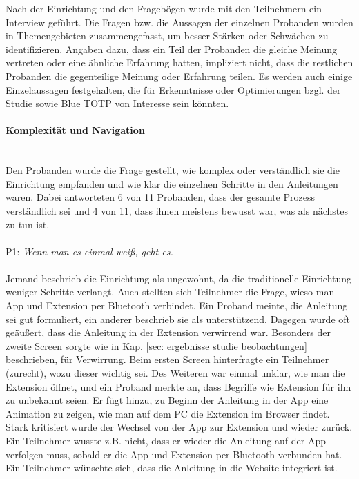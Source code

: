 Nach der Einrichtung und den Fragebögen wurde mit den Teilnehmern ein Interview 
geführt. Die Fragen bzw. die Aussagen der einzelnen Probanden wurden in 
Themengebieten zusammengefasst, um besser Stärken oder Schwächen zu 
identifizieren. Angaben dazu, dass ein Teil der Probanden die gleiche Meinung 
vertreten oder eine ähnliche Erfahrung hatten, impliziert nicht, dass die 
restlichen Probanden die gegenteilige Meinung oder Erfahrung teilen. Es werden 
auch einige Einzelaussagen festgehalten, die für Erkenntnisse oder 
Optimierungen bzgl. der Studie sowie Blue TOTP von Interesse sein könnten.

\paragraph*{Komplexität und Navigation}
\mbox{} \vspace{0.1cm} \\
Den Probanden wurde die Frage gestellt, wie komplex oder verständlich sie die 
Einrichtung empfanden und wie klar die einzelnen Schritte in den Anleitungen 
waren. Dabei antworteten 6 von 11 Probanden, dass der gesamte Prozess 
verständlich sei und 4 von 11, dass ihnen meistens bewusst war, was als nächstes 
zu tun ist.
\\\\
\hspace*{6mm} P1: \textit{\glqq Wenn man es einmal weiß, geht es.\grqq{}}
\\\\
Jemand beschrieb die Einrichtung als ungewohnt, da die traditionelle Einrichtung 
weniger Schritte verlangt. Auch stellten sich Teilnehmer die Frage, wieso man 
App und Extension per Bluetooth verbindet. Ein Proband meinte, die Anleitung sei 
gut formuliert, ein anderer beschrieb sie als unterstützend. Dagegen wurde oft 
geäußert, dass die Anleitung in der Extension verwirrend war. Besonders der 
zweite Screen sorgte wie in Kap. \ref{sec: ergebnisse studie beobachtungen} 
beschrieben, für Verwirrung. Beim ersten Screen hinterfragte ein Teilnehmer 
(zurecht), wozu dieser wichtig sei. Des Weiteren war einmal unklar, wie man die 
Extension öffnet, und ein Proband merkte an, dass Begriffe wie \glqq Extension\grqq{} für 
ihn zu unbekannt seien. Er fügt hinzu, zu Beginn der Anleitung in der App eine 
Animation zu zeigen, wie man auf dem PC die Extension im Browser findet. Stark 
kritisiert wurde der Wechsel von der App zur Extension und wieder zurück. Ein 
Teilnehmer wusste z.B. nicht, dass er wieder die Anleitung auf der App verfolgen 
muss, sobald er die App und Extension per Bluetooth verbunden hat. Ein 
Teilnehmer wünschte sich, dass die Anleitung in die Website integriert ist.

